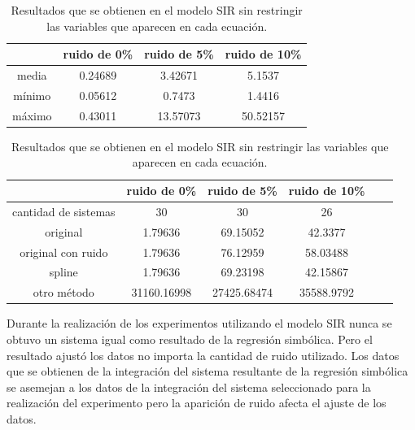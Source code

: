 \begin{table}[!h]
    \centering
    \caption{Resultados que se obtienen en el modelo SIR sin restringir las variables que aparecen en cada ecuación.}
    \begin{tabular}{|c|c|c|c|}
        \hline
               & \textbf{ruido de 0\%} & \textbf{ruido de 5\%} & \textbf{ruido de 10\%} \\
        \hline
        media  & 0.24689               & 3.42671               & 5.1537                 \\
        \hline
        mínimo & 0.05612               & 0.7473                & 1.4416                 \\
        \hline
        máximo & 0.43011               & 13.57073              & 50.52157               \\
        \hline
    \end{tabular}

    \begin{tabular}{|c|c|c|c|c|c|}
        \hline
                             & \textbf{ruido de 0\%} & \textbf{ruido de 5\%} & \textbf{ruido de 10\%} \\
        \hline
        cantidad de sistemas & 30                    & 30                    & 26                     \\
        \hline
        original             & 1.79636               & 69.15052              & 42.3377                \\
        \hline
        original con ruido   & 1.79636               & 76.12959              & 58.03488               \\
        \hline
        spline               & 1.79636               & 69.23198              & 42.15867               \\
        \hline
        otro método          & 31160.16998           & 27425.68474           & 35588.9792             \\
        \hline
    \end{tabular}
    \label{table:experiment_SIR_all}
\end{table}

Durante la realización de los experimentos utilizando el modelo SIR nunca se obtuvo un sistema igual como resultado de la regresión simbólica. Pero el resultado ajustó los datos no importa la cantidad de ruido utilizado. Los datos que se obtienen de la integración del sistema resultante de la regresión simbólica se asemejan a los datos de la integración del sistema seleccionado para la realización del experimento pero la aparición de ruido afecta el ajuste de los datos.

